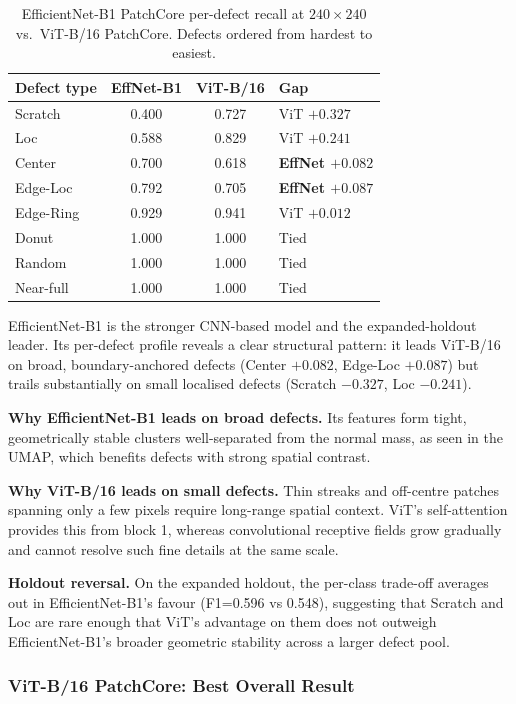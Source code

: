 \documentclass[11pt]{article}
\begin{document}
\begin{table}[H]
\centering
\small
\caption{EfficientNet-B1 PatchCore per-defect recall at $240\!\times\!240$ vs.\ ViT-B/16 PatchCore. Defects ordered from hardest to easiest.}
\label{tab:effb1_per_defect}
\begin{tabular}{lccl}
\toprule
\textbf{Defect type} & \textbf{EffNet-B1} & \textbf{ViT-B/16} & \textbf{Gap} \\
\midrule
Scratch   & 0.400 & 0.727 & ViT $+0.327$ \\
Loc       & 0.588 & 0.829 & ViT $+0.241$ \\
Center    & 0.700 & 0.618 & \textbf{EffNet $+0.082$} \\
Edge-Loc  & 0.792 & 0.705 & \textbf{EffNet $+0.087$} \\
Edge-Ring & 0.929 & 0.941 & ViT $+0.012$ \\
Donut     & 1.000 & 1.000 & Tied \\
Random    & 1.000 & 1.000 & Tied \\
Near-full & 1.000 & 1.000 & Tied \\
\bottomrule
\end{tabular}
\end{table}

EfficientNet-B1 is the stronger CNN-based model and the expanded-holdout leader. Its per-defect profile reveals a clear structural pattern: it leads ViT-B/16 on broad, boundary-anchored defects (Center $+0.082$, Edge-Loc $+0.087$) but trails substantially on small localised defects (Scratch $-0.327$, Loc $-0.241$).

\textbf{Why EfficientNet-B1 leads on broad defects.} Its features form tight, geometrically stable clusters well-separated from the normal mass, as seen in the UMAP, which benefits defects with strong spatial contrast.

\textbf{Why ViT-B/16 leads on small defects.} Thin streaks and off-centre patches spanning only a few pixels require long-range spatial context. ViT's self-attention provides this from block 1, whereas convolutional receptive fields grow gradually and cannot resolve such fine details at the same scale.

\textbf{Holdout reversal.} On the expanded holdout, the per-class trade-off averages out in EfficientNet-B1's favour (F1=0.596 vs 0.548), suggesting that Scratch and Loc are rare enough that ViT's advantage on them does not outweigh EfficientNet-B1's broader geometric stability across a larger defect pool.

\subsubsection{ViT-B/16 PatchCore: Best Overall Result}
\end{document}
